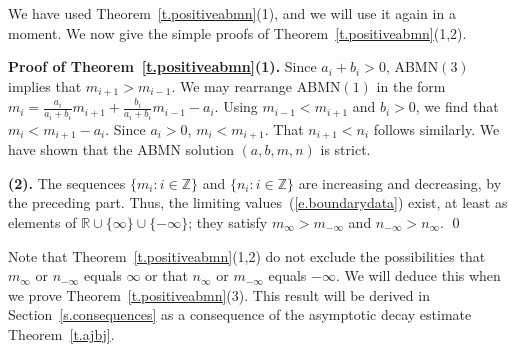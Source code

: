 \documentclass[letterpaper,11pt,oneside,reqno]{amsbook}
\newcommand{\R}{\ensuremath{\mathbb{R}}}
\newcommand{\Z}{\ensuremath{\mathbb{Z}}}
\numberwithin{figure}{chapter}
\theoremstyle{definition}
\theoremstyle{definition}
\theoremstyle{definition}
\theoremstyle{definition}
\theoremstyle{definition}
\newcommand{\mc}{\mathcal}
\newcommand{\abmnmac}{\textrm{ABMN}}
\newcommand{\abmnmacspace}{\textrm{ABMN} }
\begin{document}
We have used Theorem~\ref{t.positiveabmn}(1), and we will use it again in a moment. We now give the simple proofs of Theorem~\ref{t.positiveabmn}(1,2).

{\bf Proof of Theorem~\ref{t.positiveabmn}(1).} Since $a_i + b_i > 0$,  \abmnmac$(3)$ implies that $m_{i+1} > m_{i-1}$.  We may rearrange \abmnmac$(1)$ in the form 
$m_i   =  \tfrac{a_i}{a_i + b_i} m_{i+1} + \tfrac{b_i}{a_i + b_i} m_{i-1} - a_i$. Using $m_{i-1} <m_{i+1}$ and $b_i > 0$, we find that $m_i < m_{i+1} - a_i$. Since $a_i > 0$,
$m_i < m_{i+1}$. That $n_{i+1} < n_i$ follows similarly. We have shown that the \abmnmacspace solution $(a,b,m,n)$ is strict.


{ \bf (2).}
The sequences $\big\{ m_i: i \in \Z \big\}$ and  $\big\{ n_i: i \in \Z \big\}$ are increasing and decreasing, by the preceding part. Thus, the limiting values~(\ref{e.boundarydata}) exist, at least as elements of $\R \cup \{ \infty\} \cup \{ - \infty \}$; they satisfy $m_\infty > m_{-\infty}$ and $n_{-\infty} > n_\infty$. \qed

Note that  Theorem~\ref{t.positiveabmn}(1,2) do not exclude the possibilities that $m_\infty$ or $n_{-\infty}$ equals $\infty$ or that  $n_\infty$ or $m_{-\infty}$ equals $-\infty$. We will deduce this when we prove Theorem~\ref{t.positiveabmn}(3). This result will be derived in Section~\ref{s.consequences} as a  consequence of the asymptotic decay estimate Theorem~\ref{t.ajbj}.  
\end{document}
